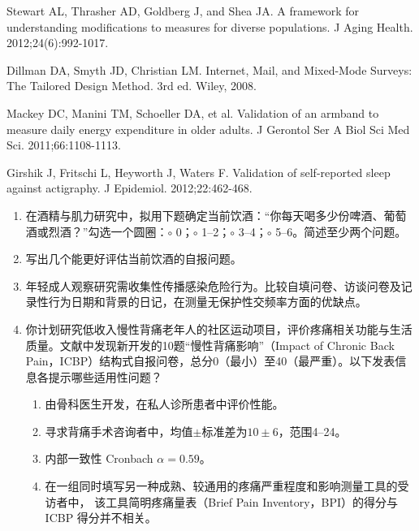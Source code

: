 \begin{references}
\item Stewart AL, Thrasher AD, Goldberg J, and Shea JA. A framework for understanding modifications to measures for diverse populations. J Aging Health. 2012;24(6):992-1017.
\item Dillman DA, Smyth JD, Christian LM. Internet, Mail, and Mixed-Mode Surveys: The Tailored Design Method. 3rd ed. Wiley, 2008.
\item Mackey DC, Manini TM, Schoeller DA, et al. Validation of an armband to measure daily energy expenditure in older adults. J Gerontol Ser A Biol Sci Med Sci. 2011;66:1108-1113.
\item Girshik J, Fritschi L, Heyworth J, Waters F. Validation of self-reported sleep against actigraphy. J Epidemiol. 2012;22:462-468.
\end{references}

\begin{enumerate}
\item 在酒精与肌力研究中，拟用下题确定当前饮酒：“你每天喝多少份啤酒、葡萄酒或烈酒？”勾选一个圆圈：$\circ$ 0；$\circ$ 1--2；$\circ$ 3--4；$\circ$ 5--6。简述至少两个问题。
\item 写出几个能更好评估当前饮酒的自报问题。
\item 年轻成人观察研究需收集性传播感染危险行为。比较自填问卷、访谈问卷及记录性行为日期和背景的日记，在测量无保护性交频率方面的优缺点。
\item 你计划研究低收入慢性背痛老年人的社区运动项目，评价疼痛相关功能与生活质量。文献中发现新开发的10题“慢性背痛影响”（Impact of Chronic Back Pain，ICBP）结构式自报问卷，总分0（最小）至40（最严重）。以下发表信息各提示哪些适用性问题？
\begin{enumerate}[label=4\alph*.]
\item 由骨科医生开发，在私人诊所患者中评价性能。
\item 寻求背痛手术咨询者中，均值$\pm$标准差为$10\pm6$，范围4--24。
\item 内部一致性 Cronbach $\alpha=0.59$。
\item 在一组同时填写另一种成熟、较通用的疼痛严重程度和影响测量工具的受访者中，
该工具简明疼痛量表（Brief Pain Inventory，BPI）的得分与 ICBP 得分并不相关。
\end{enumerate}
\end{enumerate}

